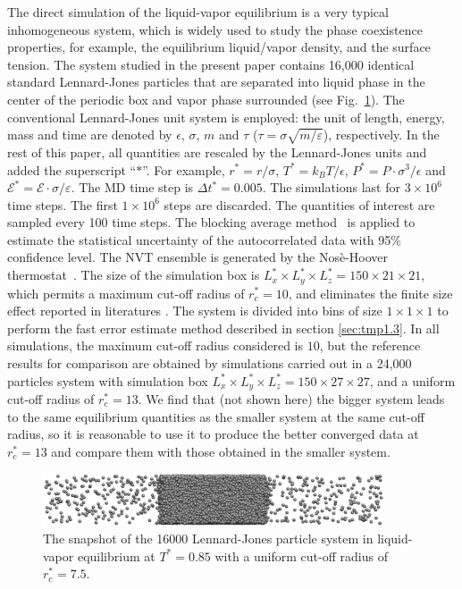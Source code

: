 \documentclass[aps,pre,preprint]{revtex4}
\newcommand{\recheck}[1]{{\color{red} #1}}
\begin{document}
The direct simulation of the liquid-vapor equilibrium is a very
typical inhomogeneous system, which is widely used to study the phase
coexistence properties, for example, the equilibrium liquid/vapor
density, and the surface tension. The system studied in the present
paper contains 16,000 identical standard Lennard-Jones particles that are
separated into liquid phase in the center of the periodic box and vapor phase
surrounded (see Fig.~\ref{fig:tmp1}).  The conventional Lennard-Jones
unit system is employed: the unit of length, energy, mass and time are
denoted by $\epsilon$, $\sigma$, $m$ and $\tau$ ($\tau =
\sigma\sqrt{m/\varepsilon}$), respectively.  In the rest of this paper,
all quantities are
rescaled by the Lennard-Jones units and added the superscript ``$\ast$''.
For example, $r^\ast = r / \sigma$, $T^\ast = k_BT / \epsilon$,
$P^\ast = P\cdot \sigma^3 / \epsilon$ and $\mathcal E^\ast = \mathcal
E\cdot\sigma/\varepsilon$.  The MD time step {is} $\Delta t^\ast =
0.005$. The simulations last for $3\times 10^6$ time steps. The first
$1\times 10^6$ steps are discarded. The quantities of interest are
sampled every 100 time steps. The blocking average
method~\cite{flyvbjerg1989error} is applied to estimate the
statistical uncertainty of the autocorrelated data with 95\%
confidence level. The NVT ensemble is generated by the Nos\`e-Hoover
thermostat~\cite{nose1984molecular, hoover1985canonical}.  The size of
the simulation box is $L_x^\ast \times L_y^\ast \times L_z^\ast =
150\times 21\times 21$, which permits a maximum cut-off radius of
$r_c^\ast = 10$, and eliminates the finite size effect reported in
literatures \cite{chen1995area, orea2005oscillatory,
  biscay2009calculation}.
The system is divided into bins of size $1\times1\times1$ to perform the fast error
estimate method described in section \ref{sec:tmp1.3}.
In all simulations, the maximum cut-off
radius considered is $10$, but the reference results for comparison
are obtained by simulations carried out in a 24,000 particles system
with simulation box $L_x^\ast \times L_y^\ast \times L_z^\ast =
150\times 27\times 27$, and a uniform cut-off radius of $r_c^\ast =
13$. \recheck {We find that (not shown here)
  the bigger system leads to the same equilibrium
  quantities as the smaller system at the same cut-off radius, so
  it is reasonable to
  use it to produce the better converged data at $r_c^\ast=13$ and compare them with
  those obtained in the smaller system.
}

\begin{figure}
  \centering
  \includegraphics[width=0.9\textwidth]{fig/t0.85-n16000-rc07.5uni/confout.eps}
  \caption{The snapshot of the 16000 Lennard-Jones particle system in
    liquid-vapor equilibrium at $T^\ast=0.85$ with a uniform cut-off
    radius of $r_c^\ast = 7.5$.}
  \label{fig:tmp1}
\end{figure}
\end{document}
